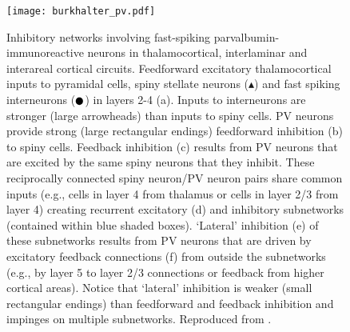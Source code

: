 \begin{figure}
	\centering
        \texttt{[image: burkhalter\_pv.pdf]}
	\caption[Proposed inhibitory circuit for feedforward inhibition
      mediated by PV cells. Reproduced from
      \cite{Burkhalter2008}.]{Inhibitory networks involving
      fast-spiking parvalbumin-immunoreactive neurons in
      thalamocortical, interlaminar and interareal cortical
      circuits. Feedforward excitatory thalamocortical inputs to
      pyramidal cells, spiny stellate neurons ($\blacktriangle$) and
      fast spiking interneurons ($\newmoon$) in layers 2-4 (a). Inputs
      to interneurons are stronger (large arrowheads) than inputs to
      spiny cells. PV neurons provide strong (large rectangular
      endings) feedforward inhibition (b) to spiny cells. Feedback
      inhibition (c) results from PV neurons that are excited by the
      same spiny neurons that they inhibit. These reciprocally
      connected spiny neuron/PV neuron pairs share common inputs
      (e.g., cells in layer 4 from thalamus or cells in layer 2/3 from
      layer 4) creating recurrent excitatory (d) and inhibitory
      subnetworks (contained within blue shaded boxes). ‘Lateral’
      inhibition (e) of these subnetworks results from PV neurons that
      are driven by excitatory feedback connections (f) from outside
      the subnetworks (e.g., by layer 5 to layer 2/3 connections or
      feedback from higher cortical areas). Notice that ‘lateral’
      inhibition is weaker (small rectangular endings) than
      feedforward and feedback inhibition and impinges on multiple
      subnetworks. Reproduced from \cite{Burkhalter2008}.}
	\label{burkhalterpv}
\end{figure}

